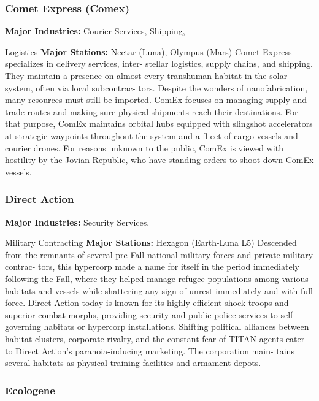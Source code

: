 \subsubsection{Comet Express (Comex)}

\textbf{Major Industries:} Courier Services, Shipping, 

Logistics
\textbf{Major Stations:} Nectar (Luna), Olympus (Mars)
Comet Express specializes in delivery services, inter-
stellar logistics, supply chains, and shipping. They 
maintain a presence on almost every transhuman 
habitat in the solar system, often via local subcontrac-
tors. Despite the wonders of nanofabrication, many 
resources must still be imported. ComEx focuses on 
managing supply and trade routes and making sure 
physical shipments reach their destinations. For that 
purpose, ComEx maintains orbital hubs equipped 
with slingshot accelerators at strategic waypoints 
throughout the system and a fl eet of cargo vessels 
and courier drones. For reasons unknown to the 
public, ComEx is viewed with hostility by the Jovian 
Republic, who have standing orders to shoot down 
ComEx vessels.

\subsubsection{Direct Action}

\textbf{Major Industries:} Security Services, 

Military Contracting
\textbf{Major Stations:} Hexagon (Earth-Luna L5)
Descended from the remnants of several pre-Fall 
national military forces and private military contrac-
tors, this hypercorp made a name for itself in the 
period immediately following the Fall, where they 
helped manage refugee populations among various 
habitats and vessels while shattering any sign of 
unrest immediately and with full force. Direct Action 
today is known for its highly-efficient shock troops 
and superior combat morphs, providing security and 
public police services to self-governing habitats or 
hypercorp installations. Shifting political alliances 
between habitat clusters, corporate rivalry, and the 
constant fear of TITAN agents cater to Direct Action's 
paranoia-inducing marketing. The corporation main-
tains several habitats as physical training facilities and 
armament depots.

\subsubsection{Ecologene}

